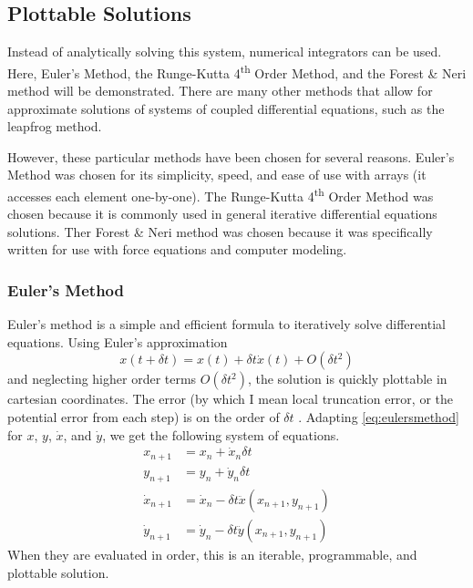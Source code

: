 \documentclass[preprint,titlepage,preprintnumbers,amsmath,amssymb,aps,11pt]{revtex4-2}
\begin{document}
\subsection{Plottable Solutions}
Instead of analytically solving this system, numerical integrators can be used. Here, Euler's Method, the Runge-Kutta 4\textsuperscript{th} Order Method, and the Forest \& Neri method will be demonstrated. There are many other methods that allow for approximate solutions of systems of coupled differential equations, such as the leapfrog method.

However, these particular methods have been chosen for several reasons. Euler's Method was chosen for its simplicity, speed, and ease of use with arrays (it accesses each element one-by-one). The Runge-Kutta 4\textsuperscript{th} Order Method was chosen because it is commonly used in general iterative differential equations solutions. Ther Forest \& Neri method was chosen because it was specifically written for use with force equations and computer modeling.

\subsubsection{Euler's Method}\label{sec:euler}
Euler's method is a simple and efficient formula to iteratively solve differential equations. Using Euler's approximation
\begin{equation}
    x(t+\delta t)=x(t)+\delta t\dot{x}(t)+O(\delta t^2)
    \label{eq:eulersmethod}
\end{equation}
and neglecting higher order terms $O(\delta t^2)$, the solution is quickly plottable in cartesian coordinates. The error (by which I mean local truncation error, or the potential error from each step) is on the order of $\delta t$ \cite[p. 298]{Wild1980}.
Adapting \ref{eq:eulersmethod} for $x$, $y$, $\dot{x}$, and $\dot{y}$, we get the following system of equations.
\begin{equation}
    \begin{aligned}
        x_{n+1}       & =x_n+\dot{x}_n\delta t                       \\
        y_{n+1}       & =y_n+\dot{y}_n\delta t                       \\
        \dot{x}_{n+1} & =\dot{x}_n-\delta t\ddot{x}(x_{n+1},y_{n+1}) \\
        \dot{y}_{n+1} & =\dot{y}_n-\delta t\ddot{y}(x_{n+1},y_{n+1})
    \end{aligned}
\end{equation}
When they are evaluated in order, this is an iterable, programmable, and plottable solution.
\end{document}
